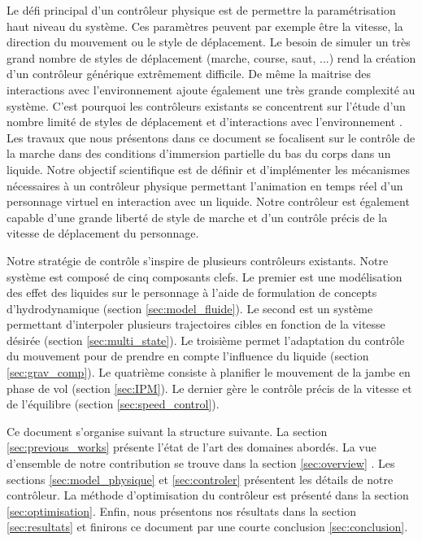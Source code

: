 \documentclass[runningheads,a4paper]{llncs}
\begin{document}
Le défi principal d'un contrôleur physique est de permettre la paramétrisation haut niveau du système. Ces paramètres peuvent par exemple être la vitesse, la direction du mouvement ou le style de déplacement. Le besoin de simuler un très grand nombre de styles de déplacement (marche, course, saut, ...) rend la création d'un contrôleur générique extrêmement difficile. De même la maitrise des interactions avec l'environnement ajoute également une très grande complexité au système. C'est pourquoi les contrôleurs existants se concentrent sur l'étude d'un nombre limité de styles de déplacement et d'interactions avec l'environnement  \cite{geijtenbeek2012interactive}. Les travaux que nous présentons dans ce document se focalisent sur le contrôle de la marche dans des conditions d'immersion partielle du bas du corps dans un liquide. Notre objectif scientifique est de définir et d'implémenter les mécanismes nécessaires à un contrôleur physique permettant l'animation en temps réel d'un personnage virtuel en interaction avec un liquide. Notre contrôleur est également capable d'une grande liberté de style de marche et d'un contrôle précis de la vitesse de déplacement du personnage.

Notre stratégie de contrôle s'inspire de plusieurs contrôleurs existants. Notre système est composé de cinq composants clefs. Le premier est une modélisation des effet des liquides sur le personnage à l'aide de formulation de concepts d'hydrodynamique (section \ref{sec:model_fluide}).
Le second est un système permettant d'interpoler plusieurs trajectoires cibles en fonction de la vitesse désirée (section \ref{sec:multi_state}). Le troisième permet l'adaptation du contrôle du mouvement pour de prendre en compte l'influence du liquide (section \ref{sec:grav_comp}).  Le quatrième consiste à planifier le mouvement de la jambe en phase de vol (section \ref{sec:IPM}). Le dernier gère le contrôle précis de la vitesse et de l'équilibre (section \ref{sec:speed_control}).

Ce document s'organise suivant la structure suivante. La section \ref{sec:previous_works} présente l'état de l'art des domaines abordés. La vue d'ensemble de notre contribution se trouve dans la section \ref{sec:overview} . Les sections \ref{sec:model_physique} et \ref{sec:controler} présentent les détails de notre contrôleur. La méthode d'optimisation du contrôleur est présenté dans la section \ref{sec:optimisation}. Enfin, nous présentons nos résultats dans la section \ref{sec:resultats} et finirons ce document par une courte conclusion \ref{sec:conclusion}.
\end{document}
